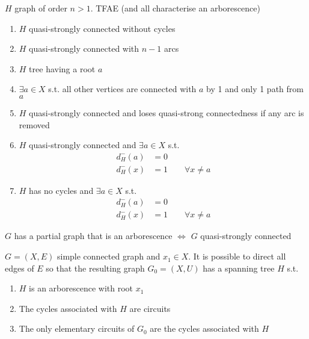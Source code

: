 \documentclass[aspectratio=43]{beamer}
\begin{document}
\begin{frame}
\begin{theorem}
$H$ graph of order $n>1$. TFAE (and all characterise an arborescence)
\begin{enumerate}
\item $H$ quasi-strongly connected without cycles
\item $H$ quasi-strongly connected with $n-1$ arcs
\item $H$ tree having a root $a$
\item $\exists a\in X$ s.t. all other vertices are connected with $a$ by 1 and only 1 path from $a$
\item $H$ quasi-strongly connected and loses quasi-strong connectedness if any arc is removed
\item $H$ quasi-strongly connected and $\exists a\in X$ s.t.
\begin{align*}
d_H^-(a)&=0 \\
d_H^-(x)&=1\qquad \forall x\neq a
\end{align*}
\item $H$ has no cycles and $\exists a\in X$ s.t.
\begin{align*}
d_H^-(a)&=0 \\
d_H^-(x)&=1\qquad \forall x\neq a
\end{align*}
\end{enumerate}
\end{theorem}
\end{frame}


\begin{frame}
\begin{theorem}
$G$ has a partial graph that is an arborescence $\iff$ $G$ quasi-strongly connected
\end{theorem}
\vfill
\begin{theorem}
$G=(X,E)$ simple connected graph and $x_1\in X$. It is possible to direct all edges of $E$ so that the resulting graph $G_0=(X,U)$ has a spanning tree $H$ s.t.
\begin{enumerate}
	\item $H$ is an arborescence with root $x_1$
	\item The cycles associated with $H$ are circuits
	\item The only elementary circuits of $G_0$ are the cycles associated with $H$
\end{enumerate}
\end{theorem}
\end{frame}
\end{document}
